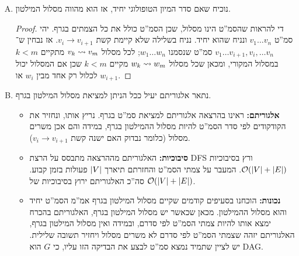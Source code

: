 \documentclass[]{../../../../tex/classes/homework}
\begin{document}
\begin{enumerate}[(A)]
\begin{proof}
\begin{itemize}
				משום שיש מספר סופי של קודקודים, המיון היחיד שייתכן במצב שבו $v_{i + 1}$ תמיד עוקב את $v_i$ במיון הטופולוגי, הוא המיון שמצאנו ממסלול ההמילטון. 
			\end{itemize}
		\end{proof}
		\item נוכיח שאם סדר המיון הטופולוגי יחיד, אז הוא מהווה מסלול המילטון. \begin{proof}
			די להראות שהסמ''ט הינו מסלול, שכן הסמ''ט כולל את כל הצמתים בגרף. יהי סמ''ט $v_1 \dots v_n$ ונניח שהוא יחיד. נניח בשלילה שלא קיימת קשת $v_i \to v_{i + 1}$. אז נבחין ש־$v_1 \dots v_{i + 1}, v_i, \dots v_n$ סמ''ט שנסמנו $w_1 \dots w_n$; לכל מסלול $v_k \rightsquigarrow v_m$ מתקיים $k<m$ במסלול המקורי, ומכאן שכל מסלול $w_k \rightsquigarrow w_m$ מקיים $k < m$ שכן אם המסלול יכול לכלול רק אחד מבין $w_i$ או $w_{i + 1}$. 
		\end{proof}
		\item נתאר אלגוריתם יעיל ככל הניתן למציאת מסלול המילטון בגרף. 
		\begin{itemize}
			\item \textbf{אלגוריתם: }ראינו בהרצאה אלגוריתם למציאת סמ''ט בגרף. נריץ אותו, ונחזיר את הקודקודים לפי סדר הסמ''ט להיות מסלול ההמילטון בגרף, במידה והם אכן משרים מסלול (כלומר נבדוק האם ישנה קשת $v_i \to v_{i + 1}$). 
			\item \textbf{סיבוכיות: }האלגוריתם מההרצאה מתבסס על הרצת DFS ורץ בסיבוכיות $\mathcal{O}(\left \lvert V \right \rvert + \left \lvert E \right \rvert)$. המעבר על צמתי הסמ''ט והחזרתם תיארך $\left \lvert V \right \rvert$ פעולות בזמן קבוע. סה''כ האלגוריתם ירוץ בסיבוכיות של $\mathcal{O}(\left \lvert V \right \rvert + \left \lvert E \right \rvert)$. 
			\item \textbf{נכונות: }הוכחנו בסעיפים קודמים שקיים מסלול המילטון בגרף אמ''מ הסמ''ט יחיד והוא מסלול ההמילטון. מכאן שכאשר יש מסלול המילטון בגרף, האלגוריתם בהכרח ימצא אותו להיות צמתי הסמ''ט לפי סדרם, ובמידה ואין מסלול המילטון בגרף, האלגוריתם יזהה שצמתי הסמ''ט לפי סדרם לא משרים מסלול ויחזיר תשובה שלילית. יש לציין שתמיד נמצא סמ''ט לבצע את הבדיקה הזו עליו, כי $G$ הוא DAG. 
		\end{itemize}
	\end{enumerate}
	
	\npage
\end{document}
